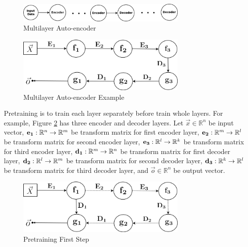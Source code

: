 \documentclass[draft,dvipsnames]{drexel-thesis}
\begin{document}
\begin{thesis}
\begin{figure}[t!]
    \centering
    \includegraphics[width=0.75\textwidth]{pictures/figures/MAE.png}
    \caption{Multilayer Auto-encoder}
    \label{fig:MAE}
\end{figure}

\begin{figure}[t!]
    \centering
    \includegraphics[width=0.75\textwidth]{pictures/figures/example_MAE.png}
    \caption{Multilayer Auto-encoder Example}
    \label{fig:example_MAE}
\end{figure}

	Pretraining is to train each layer separately before train whole layers. For example, Figure \ref{fig:example_MAE} has three encoder and decoder layers. Let $\vec{x} \in \mathbb{R}^n$ be input vector, $\bold{e_1}: \mathbb{R}^n \rightarrow \mathbb{R}^m$ be transform matrix for first encoder layer, $\bold{e_2}: \mathbb{R}^m \rightarrow \mathbb{R}^l$ be transform matrix for second encoder layer, $\bold{e_3}: \mathbb{R}^l \rightarrow \mathbb{R}^k$ be transform matrix for third encoder layer, $\bold{d_1}: \mathbb{R}^m \rightarrow \mathbb{R}^n$ be transform matrix for first decoder layer, $\bold{d_2}: \mathbb{R}^l \rightarrow \mathbb{R}^m$ be transform matrix for second decoder layer, $\bold{d_3}: \mathbb{R}^k \rightarrow \mathbb{R}^l$ be transform matrix for third decoder layer, and $\vec{o} \in \mathbb{R}^n$ be output vector.

\begin{figure}[t!]
    \centering
    \includegraphics[width=0.75\textwidth]{pictures/figures/train_MAE1.png}
    \caption{Pretraining First Step}
    \label{fig:train_MAE1}
\end{figure}


\end{thesis}
\end{document}
